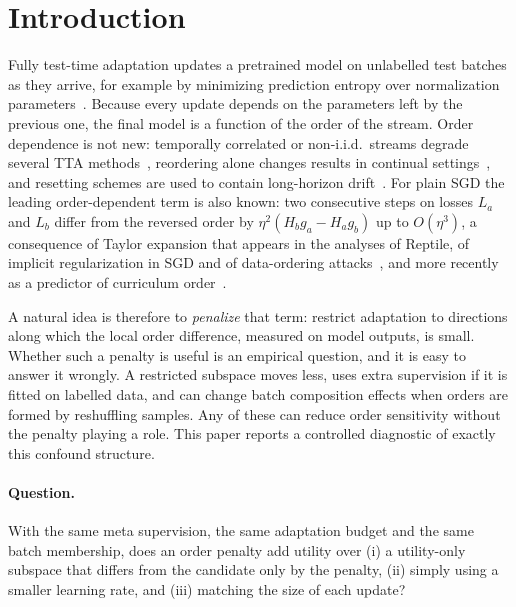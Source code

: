 \section{Introduction}
\label{sec:intro}

Fully test-time adaptation updates a pretrained model on unlabelled test batches as they arrive, for
example by minimizing prediction entropy over normalization parameters~\citep{wang2021tent}. Because every
update depends on the parameters left by the previous one, the final model is a function of the order of
the stream. Order dependence is not new: temporally correlated or non-i.i.d.\ streams degrade several TTA
methods~\citep{gong2022note,yuan2023rotta,niu2023sar,zhao2023pitfalls}, reordering alone changes results
in continual settings~\citep{wang2022cotta,dobler2023rmt,gao2023dda}, and resetting schemes are used to
contain long-horizon drift~\citep{press2023rdumb,niu2023sar,lim2026asr,hoang2024petta}. For plain SGD the
leading order-dependent term is also known: two consecutive steps on losses $L_a$ and $L_b$ differ from the
reversed order by $\eta^2(H_b g_a - H_a g_b)$ up to $O(\eta^3)$, a consequence of Taylor expansion that
appears in the analyses of Reptile, of implicit regularization in SGD and of data-ordering
attacks~\citep{nichol2018reptile,smith2021origin,shumailov2021ordering}, and more recently as a predictor
of curriculum order~\citep{sweeney2026lie}.

A natural idea is therefore to \emph{penalize} that term: restrict adaptation to directions along which
the local order difference, measured on model outputs, is small. Whether such a penalty is useful is an
empirical question, and it is easy to answer it wrongly. A restricted subspace moves less, uses extra
supervision if it is fitted on labelled data, and can change batch composition effects when orders are
formed by reshuffling samples. Any of these can reduce order sensitivity without the penalty playing a
role. This paper reports a controlled diagnostic of exactly this confound structure.

\paragraph{Question.} With the same meta supervision, the same adaptation budget and the same batch
membership, does an order penalty add utility over (i) a utility-only subspace that differs from the
candidate only by the penalty, (ii) simply using a smaller learning rate, and (iii) matching the size of
each update?

